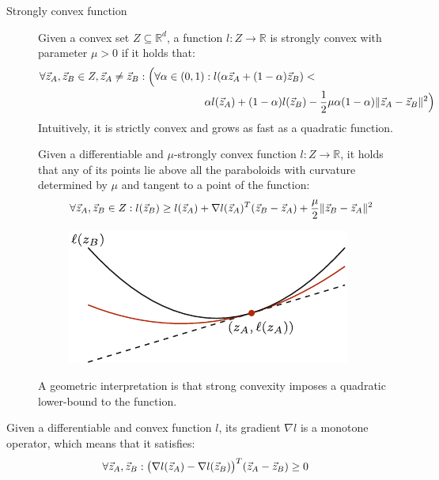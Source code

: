 \begin{description}
    \item[Strongly convex function] 
        Given a convex set $Z \subseteq \mathbb{R}^d$, a function $l: Z \rightarrow \mathbb{R}$ is strongly convex with parameter $\mu > 0$ if it holds that:
        \[
            \begin{split}
                \forall {\vec{z}}_A, {\vec{z}}_B \in Z, {\vec{z}}_A \neq {\vec{z}}_B: \Big( \forall \alpha \in (0, 1)&: l(\alpha {\vec{z}}_A + (1-\alpha) {\vec{z}}_B) < \\
                &\alpha l({\vec{z}}_A) + (1-\alpha) l({\vec{z}}_B) - \frac{1}{2} \mu \alpha (1-\alpha) \Vert {\vec{z}}_A-{\vec{z}}_B \Vert^2 \Big)
            \end{split}
        \]
        Intuitively, it is strictly convex and grows as fast as a quadratic function.

        \begin{remark}
            Given a differentiable and $\mu$-strongly convex function $l: Z \rightarrow \mathbb{R}$, it holds that any of its points lie above all the paraboloids with curvature determined by $\mu$ and tangent to a point of the function:
            \[ \forall {\vec{z}}_A, {\vec{z}}_B \in Z: l({\vec{z}}_B) \geq l({\vec{z}}_A) + \nabla l({\vec{z}}_A)^T ({\vec{z}}_B - {\vec{z}}_A) + \frac{\mu}{2} \Vert {\vec{z}}_B - {\vec{z}}_A \Vert^2 \]

            \begin{figure}[H]
                \centering
                \includegraphics[width=0.35\linewidth]{img/_strongly_convex.pdf}
            \end{figure}

            A geometric interpretation is that strong convexity imposes a quadratic lower-bound to the function.
        \end{remark}
\end{description}

\begin{lemma} 
    Given a differentiable and convex function $l$, its gradient $\nabla l$ is a monotone operator, which means that it satisfies:
    \[
        \forall {\vec{z}}_A, {\vec{z}}_B: \big( \nabla l({\vec{z}}_A) - \nabla l({\vec{z}}_B) \big)^T ({\vec{z}}_A - {\vec{z}}_B) \geq 0
    \]
\end{lemma}

